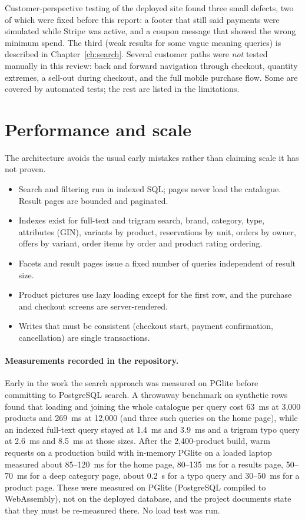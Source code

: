 Customer-perspective testing of the deployed site found three small defects, two of which were fixed before this report: a footer that still said payments were simulated while Stripe was active, and a coupon message that showed the wrong minimum spend. The third (weak results for some vague meaning queries) is described in Chapter~\ref{ch:search}. Several customer paths were \emph{not} tested manually in this review: back and forward navigation through checkout, quantity extremes, a sell-out during checkout, and the full mobile purchase flow. Some are covered by automated tests; the rest are listed in the limitations.

\section{Performance and scale}

The architecture avoids the usual early mistakes rather than claiming scale it has not proven.

\begin{itemize}
\item Search and filtering run in indexed SQL; pages never load the catalogue. Result pages are bounded and paginated.
\item Indexes exist for full-text and trigram search, brand, category, type, attributes (GIN), variants by product, reservations by unit, orders by owner, offers by variant, order items by order and product rating ordering.
\item Facets and result pages issue a fixed number of queries independent of result size.
\item Product pictures use lazy loading except for the first row, and the purchase and checkout screens are server-rendered.
\item Writes that must be consistent (checkout start, payment confirmation, cancellation) are single transactions.
\end{itemize}

\paragraph{Measurements recorded in the repository.} Early in the work the search approach was measured on PGlite before committing to PostgreSQL search. A throwaway benchmark on synthetic rows found that loading and joining the whole catalogue per query cost 63~ms at 3,000 products and 269~ms at 12,000 (and three such queries on the home page), while an indexed full-text query stayed at 1.4~ms and 3.9~ms and a trigram typo query at 2.6~ms and 8.5~ms at those sizes. After the 2,400-product build, warm requests on a production build with in-memory PGlite on a loaded laptop measured about 85--120~ms for the home page, 80--135~ms for a results page, 50--70~ms for a deep category page, about 0.2~s for a typo query and 30--50~ms for a product page. These were measured on PGlite (PostgreSQL compiled to WebAssembly), not on the deployed database, and the project documents state that they must be re-measured there. No load test was run.

